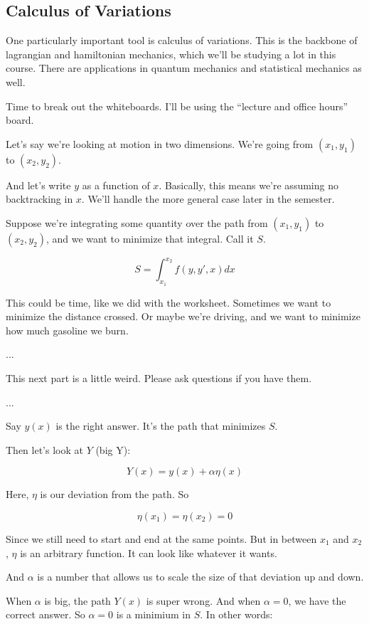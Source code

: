 \documentclass[10pt]{article}
\begin{document}
\subsection*{Calculus of Variations}

One particularly important tool is calculus of variations. This is the backbone of lagrangian and hamiltonian mechanics, which we'll be studying a lot in this course. There are applications in quantum mechanics and statistical mechanics as well. 

Time to break out the whiteboards. I'll be using the ``lecture and office hours'' board. 

Let's say we're looking at motion in two dimensions. We're going from $\left( x_1, y_1 \right)$ to $\left( x_2, y_2 \right)$.

And let's write $y$ as a function of $x$. Basically, this means we're assuming no backtracking in $x$. We'll handle the more general case later in the semester. 

Suppose we're integrating some quantity over the path from $\left( x_1, y_1 \right)$ to $\left( x_2, y_2 \right)$, and we want to minimize that integral. Call it $S$. 

$$
S = \displaystyle\int_{x_1}^{x_2} f(y, y', x) dx
$$

This could be time, like we did with the worksheet. Sometimes we want to minimize the distance crossed. Or maybe we're driving, and we want to minimize how much gasoline we burn. 

...

This next part is a little weird. Please ask questions if you have them.

...

Say $y(x)$ is the right answer. It's the path that minimizes $S$. 

Then let's look at $Y$ (big Y):

$$
Y(x) = y(x) + \alpha \eta(x)
$$

Here, $\eta$ is our deviation from the path. So

$$
\eta(x_1) = \eta(x_2) = 0
$$

Since we still need to start and end at the same points. But in between $x_1$ and $x_2$, $\eta$ is an arbitrary function. It can look like whatever it wants. 

And $\alpha$ is a number that allows us to scale the size of that deviation up and down. 

When $\alpha$ is big, the path $Y(x)$ is super wrong. And when $\alpha=0$, we have the correct answer. So $\alpha=0$ is a minimium in $S$. In other words:
\end{document}
